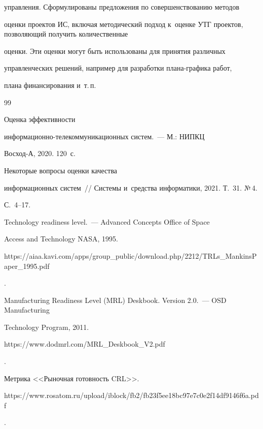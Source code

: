 управ\-ле\-ния. Сформулированы предложения по совершенствованию методов 

оценки проектов ИС, включая методический подход к~оценке УТГ проектов, позволяющий получить количественные 

оценки. Эти оценки могут быть использованы для принятия различных 

управленческих решений, например для разработки пла\-на-гра\-фи\-ка работ, 

плана финансирования и~т.\,п.

  

{\small\frenchspacing

{%


\begin{thebibliography}{99}


   Оценка эффективности  

ин\-фор\-ма\-ци\-он\-но-те\-ле\-ком\-му\-ни\-ка\-ци\-он\-ных сис\-тем.~--- М.: НИПКЦ 

Восход-А, 2020. 120~с.


   Некоторые вопросы оценки качества 

информационных сис\-тем~/\!\!/ Системы и~средства информатики, 2021. Т.~31. №\,4.  

С.~4--17.


    Technology readiness level.~--- Advanced Concepts Office of Space 

Access and Technology NASA, 1995. {\sf 

https://aiaa.kavi.com/apps/group\_public/\linebreak download.php/2212/TRLs\_MankinsPaper\_1995.pdf}.


  Manufacturing Readiness Level (MRL) Deskbook. Version 2.0.~--- OSD Manufacturing 

Technology Program, 2011. {\sf 

https://www.dodmrl.com/MRL\_Deskbook\_V2.pdf}.


  Метрика <<Рыночная готовность CRL>>. {\sf 

https://www.rosatom.ru/upload/iblock/\linebreak fb2/fb23f5ee18bc97e7c0e2f14df9146f6a.pdf}.


\end{thebibliography}}}
